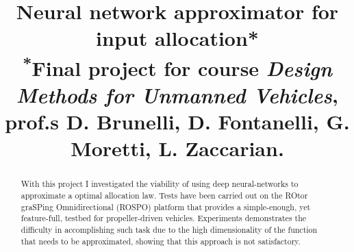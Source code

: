 \documentclass[conference]{IEEEtran}
\begin{document}
    \title{Neural network approximator for input allocation*\\
        {\footnotesize \textsuperscript{*}Final project for course \textit{Design Methods for Unmanned Vehicles}, prof.s D. Brunelli, D. Fontanelli, G. Moretti, L. Zaccarian.}
    }

    \author{
        }


    \maketitle

    \begin{abstract}
        With this project I investigated the viability of using deep neural-networks to approximate a optimal allocation law.
        Tests have been carried out on the ROtor graSPing Omnidirectional (ROSPO) platform \cite{rospo} that provides a simple-enough, yet feature-full, testbed for propeller-driven vehicles.
        Experiments demonstrates the difficulty in accomplishing such task due to the high dimensionality of the function that needs to be approximated, showing that this approach is not satisfactory.
    \end{abstract}

    
    
    
    
    
    

    \printbibliography
\end{document}
